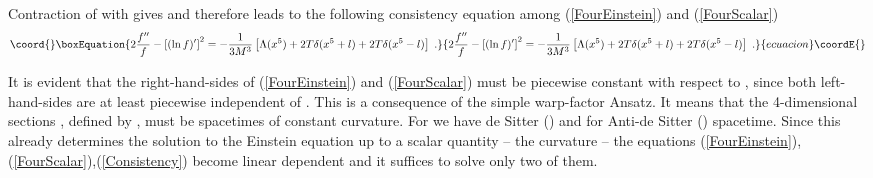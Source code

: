 \documentclass[a4paper,12pt]{article}
\begin{document}
Contraction of \coordHE{} with \coordHE{} gives
\coordHE{} and therefore
leads to the following consistency equation among (\ref{FourEinstein}) and
(\ref{FourScalar})
\begin{equation}\coord{}\boxEquation{
    2\frac{f^{\prime\prime}}{f}-\left[(\ln f)^\prime\right]^2
  = -\frac{1}{3M^3}\left[ \Lambda(x^5)+2T\delta(x^5+l)+2T\delta(x^5-l)
                   \right] \; .
    \label{Consistency}
}{
    2\frac{f^{\prime\prime}}{f}-\left[(\ln f)^\prime\right]^2
  = -\frac{1}{3M^3}\left[ \Lambda(x^5)+2T\delta(x^5+l)+2T\delta(x^5-l)
                   \right] \; .
    }{ecuacion}\coordE{}\end{equation} 

It is evident that the right-hand-sides of (\ref{FourEinstein}) and
(\ref{FourScalar}) must be piecewise constant with respect to \coordHE{}, since
both left-hand-sides are at least piecewise independent of \coordHE{}.
This is a consequence of the simple warp-factor Ansatz.
It means that the 4-dimensional sections \coordHE{}, defined by \coordHE{},
must be spacetimes of constant curvature. For \coordHE{} we have de Sitter
(\coordHE{}) and for \coordHE{} Anti-de Sitter (\coordHE{})
spacetime. Since this already determines the solution to the Einstein equation
up to a scalar quantity -- the curvature -- the equations
(\ref{FourEinstein}),(\ref{FourScalar}),(\ref{Consistency}) become linear
dependent and it suffices to solve only two of them.
\end{document}
